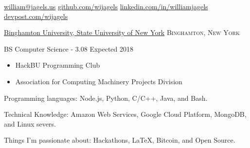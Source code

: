 \documentclass[11pt]{article}
\begin{document}
\sloppy  %



\nobreakvspace{0.3em}  %

\noindent\href{mailto:william@jagels.us}{william@jagels.us}\sbull
\href{https://github.com/wijagels}{github.com/wijagels}\sbull
\href{https://www.linkedin.com/in/williamjagels}{linkedin.com/in/williamjagels}\sbull
\href{http://devpost.com/wijagels}{devpost.com/wijagels}



\spacedhrule{0.1em}{0.9em}  %

\headedsection
{\href{http://www.binghamton.edu/index.php}{Binghamton University, State University of New York}}
{\textsc{Binghamton, New York}} {
    \headedsubsection
    {BS Computer Science -  3.08}
    {Expected 2018}
    {
        \begin{itemize}
            \item HackBU Programming Club
            \item Association for Computing Machinery Projects Division
        \end{itemize}
    }
}



\spacedhrule{0.1em}{0.9em}  %

\inlineheadsection  %
{Programming languages:}
{ Node.js, Python, C/C++, Java, and Bash.}


\inlineheadsection
{Technical Knowledge:}
{ Amazon Web Services, Google Cloud Platform, MongoDB, and Linux severs. }

\inlineheadsection
{Things I'm passionate about:}
{Hackathons, \LaTeX, Bitcoin, and Open Source.}




\spacedhrule{0.1em}{0.9em}  %
\end{document}
